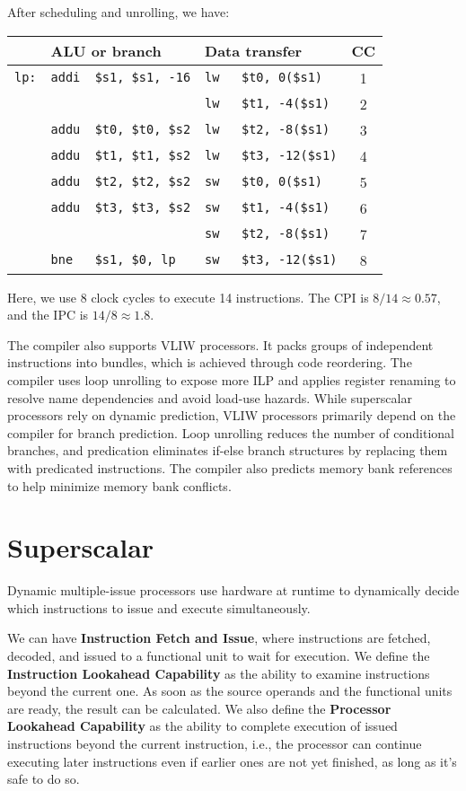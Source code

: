 After scheduling and unrolling, we have:

\begin{table}[H]
  \centering
  \begin{tabular}{c|l|l|c}
      \toprule
       & \qquad ALU or branch &\qquad Data transfer & CC  \\
    \midrule
      \verb|lp:| & \verb|addi  $s1, $s1, -16| & \verb|lw   $t0, 0($s1)| & 1  \\
       &  & \verb|lw   $t1, -4($s1)| & 2  \\
       & \verb|addu  $t0, $t0, $s2| & \verb|lw   $t2, -8($s1)| & 3  \\
       & \verb|addu  $t1, $t1, $s2| & \verb|lw   $t3, -12($s1)| & 4  \\
       & \verb|addu  $t2, $t2, $s2| & \verb|sw   $t0, 0($s1)| & 5  \\
       & \verb|addu  $t3, $t3, $s2| & \verb|sw   $t1, -4($s1)| & 6  \\
       &  & \verb|sw   $t2, -8($s1)| & 7  \\
       & \verb|bne   $s1, $0, lp| & \verb|sw   $t3, -12($s1)| & 8  \\
      \bottomrule
  \end{tabular}
\end{table}

Here, we use 8 clock cycles to execute 14 instructions. The CPI is \(8 / 14 \approx 0.57\), and the IPC is \(14 / 8 \approx 1.8\).

The compiler also supports VLIW processors. It packs groups of independent instructions into bundles, which is achieved through code reordering. The compiler uses loop unrolling to expose more ILP and applies register renaming to resolve name dependencies and avoid load-use hazards. While superscalar processors rely on dynamic prediction, VLIW processors primarily depend on the compiler for branch prediction. Loop unrolling reduces the number of conditional branches, and predication eliminates if-else branch structures by replacing them with predicated instructions. The compiler also predicts memory bank references to help minimize memory bank conflicts.

\section{Superscalar}
Dynamic multiple-issue processors use hardware at runtime to dynamically decide which instructions to issue and execute simultaneously. 

We can have \textbf{Instruction Fetch and Issue}, where instructions are fetched, decoded, and issued to a functional unit to wait for execution. We define the \textbf{Instruction Lookahead Capability} as the ability to examine instructions beyond the current one. As soon as the source operands and the functional units are ready, the result can be calculated. We also define the \textbf{Processor Lookahead Capability} as the ability to complete execution of issued instructions beyond the current instruction, i.e., the processor can continue executing later instructions even if earlier ones are not yet finished, as long as it's safe to do so. 

